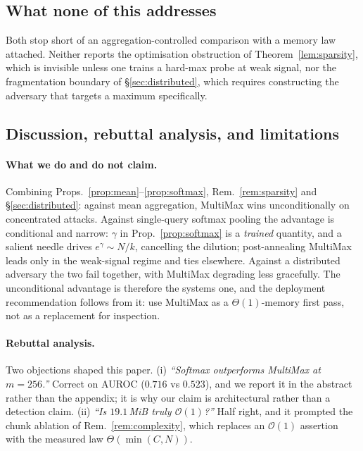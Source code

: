 \documentclass[10pt]{article}
\theoremstyle{plain}
\theoremstyle{definition}
\theoremstyle{remark}
\begin{document}
\subsection{What none of this addresses}

Both stop short of an aggregation-controlled comparison with a memory law attached. Neither
reports the optimisation obstruction of Theorem~\ref{lem:sparsity}, which is invisible
unless one trains a hard-max probe at weak signal, nor the fragmentation boundary of
\S\ref{sec:distributed}, which requires constructing the adversary that targets a maximum
specifically.

\subsection{Discussion, rebuttal analysis, and limitations}
\paragraph{What we do and do not claim.}
Combining Props.~\ref{prop:mean}--\ref{prop:softmax}, Rem.~\ref{rem:sparsity} and
\S\ref{sec:distributed}: against mean aggregation, MultiMax wins unconditionally on
concentrated attacks. Against single-query softmax pooling the advantage is conditional
and narrow: $\gamma$ in Prop.~\ref{prop:softmax} is a \emph{trained} quantity, and a
salient needle drives $e^{\gamma}\!\sim\!N/k$, cancelling the dilution; post-annealing
MultiMax leads only in the weak-signal regime and ties elsewhere. Against a distributed
adversary the two fail together, with MultiMax degrading less gracefully. The
unconditional advantage is therefore the systems one, and the deployment recommendation
follows from it: use MultiMax as a $\Theta(1)$-memory first pass, not as a replacement for
inspection.

\paragraph{Rebuttal analysis.}
Two objections shaped this paper. (i) \emph{``Softmax outperforms MultiMax at $m{=}256$.''}
Correct on AUROC ($0.716$ vs $0.523$), and we report it in the abstract rather than the
appendix; it is why our claim is architectural rather than a detection claim.
(ii) \emph{``Is $19.1$\,MiB truly $\mathcal{O}(1)$?''} Half right, and it prompted the
chunk ablation of Rem.~\ref{rem:complexity}, which replaces an $\mathcal{O}(1)$ assertion
with the measured law $\Theta(\min(C,N))$.
\end{document}
